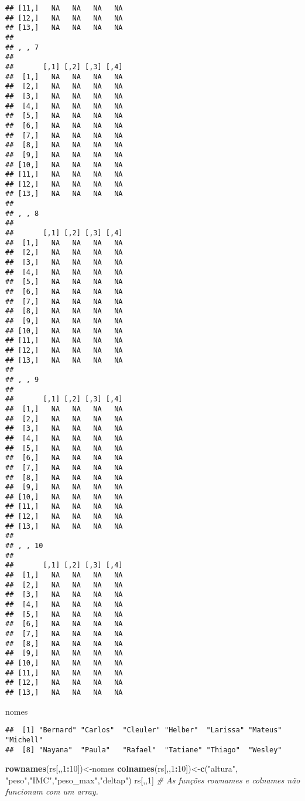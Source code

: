 \documentclass[]{article}
\newenvironment{Shaded}{\begin{snugshade}}{\end{snugshade}}
\newcommand{\KeywordTok}[1]{\textcolor[rgb]{0.13,0.29,0.53}{\textbf{#1}}}
\newcommand{\DecValTok}[1]{\textcolor[rgb]{0.00,0.00,0.81}{#1}}
\newcommand{\StringTok}[1]{\textcolor[rgb]{0.31,0.60,0.02}{#1}}
\newcommand{\CommentTok}[1]{\textcolor[rgb]{0.56,0.35,0.01}{\textit{#1}}}
\newcommand{\OperatorTok}[1]{\textcolor[rgb]{0.81,0.36,0.00}{\textbf{#1}}}
\newcommand{\NormalTok}[1]{#1}
\begin{document}
\begin{verbatim}
## [11,]   NA   NA   NA   NA
## [12,]   NA   NA   NA   NA
## [13,]   NA   NA   NA   NA
## 
## , , 7
## 
##       [,1] [,2] [,3] [,4]
##  [1,]   NA   NA   NA   NA
##  [2,]   NA   NA   NA   NA
##  [3,]   NA   NA   NA   NA
##  [4,]   NA   NA   NA   NA
##  [5,]   NA   NA   NA   NA
##  [6,]   NA   NA   NA   NA
##  [7,]   NA   NA   NA   NA
##  [8,]   NA   NA   NA   NA
##  [9,]   NA   NA   NA   NA
## [10,]   NA   NA   NA   NA
## [11,]   NA   NA   NA   NA
## [12,]   NA   NA   NA   NA
## [13,]   NA   NA   NA   NA
## 
## , , 8
## 
##       [,1] [,2] [,3] [,4]
##  [1,]   NA   NA   NA   NA
##  [2,]   NA   NA   NA   NA
##  [3,]   NA   NA   NA   NA
##  [4,]   NA   NA   NA   NA
##  [5,]   NA   NA   NA   NA
##  [6,]   NA   NA   NA   NA
##  [7,]   NA   NA   NA   NA
##  [8,]   NA   NA   NA   NA
##  [9,]   NA   NA   NA   NA
## [10,]   NA   NA   NA   NA
## [11,]   NA   NA   NA   NA
## [12,]   NA   NA   NA   NA
## [13,]   NA   NA   NA   NA
## 
## , , 9
## 
##       [,1] [,2] [,3] [,4]
##  [1,]   NA   NA   NA   NA
##  [2,]   NA   NA   NA   NA
##  [3,]   NA   NA   NA   NA
##  [4,]   NA   NA   NA   NA
##  [5,]   NA   NA   NA   NA
##  [6,]   NA   NA   NA   NA
##  [7,]   NA   NA   NA   NA
##  [8,]   NA   NA   NA   NA
##  [9,]   NA   NA   NA   NA
## [10,]   NA   NA   NA   NA
## [11,]   NA   NA   NA   NA
## [12,]   NA   NA   NA   NA
## [13,]   NA   NA   NA   NA
## 
## , , 10
## 
##       [,1] [,2] [,3] [,4]
##  [1,]   NA   NA   NA   NA
##  [2,]   NA   NA   NA   NA
##  [3,]   NA   NA   NA   NA
##  [4,]   NA   NA   NA   NA
##  [5,]   NA   NA   NA   NA
##  [6,]   NA   NA   NA   NA
##  [7,]   NA   NA   NA   NA
##  [8,]   NA   NA   NA   NA
##  [9,]   NA   NA   NA   NA
## [10,]   NA   NA   NA   NA
## [11,]   NA   NA   NA   NA
## [12,]   NA   NA   NA   NA
## [13,]   NA   NA   NA   NA
\end{verbatim}

\begin{Shaded}
\begin{Highlighting}[]
\NormalTok{nomes}
\end{Highlighting}
\end{Shaded}

\begin{verbatim}
##  [1] "Bernard" "Carlos"  "Cleuler" "Helber"  "Larissa" "Mateus"  "Michell"
##  [8] "Nayana"  "Paula"   "Rafael"  "Tatiane" "Thiago"  "Wesley"
\end{verbatim}

\begin{Shaded}
\begin{Highlighting}[]
\KeywordTok{rownames}\NormalTok{(rs[,,}\DecValTok{1}\OperatorTok{:}\DecValTok{10}\NormalTok{])<-nomes}
\KeywordTok{colnames}\NormalTok{(rs[,,}\DecValTok{1}\OperatorTok{:}\DecValTok{10}\NormalTok{])<-}\KeywordTok{c}\NormalTok{(}\StringTok{"altura"}\NormalTok{, }\StringTok{"peso"}\NormalTok{,}\StringTok{"IMC"}\NormalTok{,}\StringTok{"peso_max"}\NormalTok{,}\StringTok{"deltap"}\NormalTok{)}
\NormalTok{rs[,,}\DecValTok{1}\NormalTok{] }\CommentTok{# As funções rownames e colnames não funcionam com um array.}
\end{Highlighting}
\end{Shaded}
\end{document}
